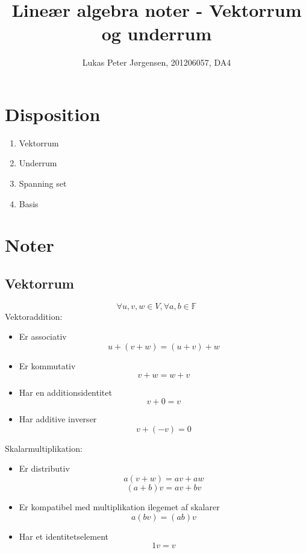 \documentclass[a4paper,oneside,article]{memoir}
\begin{document}
    \title{Lineær algebra noter - Vektorrum og underrum}
    \author{Lukas Peter Jørgensen, 201206057, DA4
            }
    \maketitle

	\tableofcontents
        
    \chapter{Disposition}
    \begin{enumerate}
    	\item Vektorrum
    	\item Underrum
    	\item Spanning set
    	\item Basis
    \end{enumerate}
    
	\chapter{Noter}
	
	\section{Vektorrum}
	$$\forall u,v,w \in V, \forall a,b \in \mathbb{F}$$
	Vektoraddition:
	\begin{itemize}
	\item Er associativ
	$$u+(v+w)=(u+v)+w$$
	\item Er kommutativ
	$$v+w=w+v$$
	\item Har en additionsidentitet
	$$v+0=v$$
	\item Har additive inverser
	$$v+(-v)=0$$
	\end{itemize}
    
    Skalarmultiplikation:
    \begin{itemize}
    \item Er distributiv
    $$a(v+w)=av+aw$$
    $$(a+b)v=av+bv$$
    \item Er kompatibel med multiplikation ilegemet af skalarer
    $$a(bv)=(ab)v$$
    \item Har et identitetselement
    $$1v=v$$
    \end{itemize}
    
\end{document}
